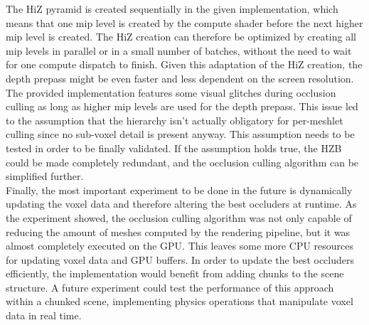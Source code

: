 \noindent
The \ac{HiZ} pyramid is created sequentially in the given implementation, which means that one mip level is 
created by the compute shader before the next higher mip level is created. The \ac{HiZ} creation can therefore 
be optimized by creating all mip levels in parallel or in a small number of batches, without the need to wait 
for one compute dispatch to finish. Given this adaptation of the \ac{HiZ} creation, the depth prepass might be 
even faster and less dependent on the screen resolution. \\

\noindent
The provided implementation features some visual glitches during occlusion culling as long as higher mip levels 
are used for the depth prepass. This issue led to the assumption that the hierarchy isn't actually obligatory 
for per-meshlet culling since no sub-voxel detail is present anyway. This assumption needs to be tested in 
order to be finally validated. If the assumption holds true, the \ac{HZB} could be made completely redundant, and 
the occlusion culling algorithm can be simplified further. \\

\noindent
Finally, the most important experiment to be done in the future is dynamically updating the voxel data and therefore 
altering the best occluders at runtime. As the experiment showed, the occlusion culling algorithm was not only 
capable of reducing the amount of meshes computed by the rendering pipeline, but it was almost completely executed 
on the \ac{GPU}. This leaves some more \ac{CPU} resources for updating voxel data and \ac{GPU} buffers. In order 
to update the best occluders efficiently, the implementation would benefit from adding chunks to the scene structure. 
A future experiment could test the performance of this approach within a chunked scene, implementing physics operations 
that manipulate voxel data in real time. 

